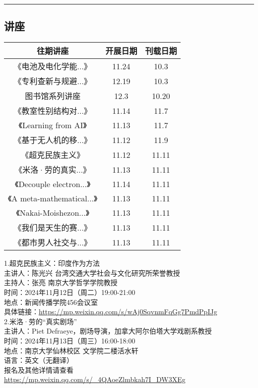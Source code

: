 \documentclass[letterpaper, 12pt]{article}
\begin{document}
\hrule
\pagebreak
\begin{multicols}{2}

\section{讲座}
\begin{tabular}{|c|c|c|}
    \hline
    往期讲座 & 开展日期 & 刊载日期\\
    \hline\hline
    《电池及电化学能...》 & 11.24 & 10.3\\
    《专利查新与规避...》 & 12.19 & 10.3\\
    图书馆系列讲座 & 12.3 & 10.20\\
    《教室性别结构对...》 & 11.14 & 11.7\\
    《Learning from AI》 & 11.13 & 11.7\\
    《基于无人机的移...》 & 11.12 & 11.9\\
    《超克民族主义》 & 11.12 & 11.11\\
    《米洛·劳的真实...》 & 11.13 & 11.11\\
    《Decouple electron...》 & 11.14 & 11.11\\
    《A meta-mathematical...》 & 11.13 & 11.11\\
    《Nakai-Moishezon...》 & 11.13 & 11.11\\
    《我们是天生的赛...》 & 11.13 & 11.11\\
    《都市男人社交与...》 & 11.13 & 11.11\\
    \hline
\end{tabular}

1.超克民族主义：印度作为方法\\
主讲人：陈光兴 台湾交通大学社会与文化研究所荣誉教授\\
主持人：张亮 南京大学哲学学院教授\\
时间：2024年11月12日（周二）19:00-21:00\\
地点：新闻传播学院456会议室\\
具体链接：\url{https://mp.weixin.qq.com/s/wAj0SqvnmFqGg7PmdPpIJg}\\

2.米洛·劳的“真实剧场”\\
主讲人：Piet Defraeye，剧场导演，加拿大阿尔伯塔大学戏剧系教授\\
时间：2024年11月13日（周三）16:00-18:00\\
地点：南京大学仙林校区 文学院二楼活水轩\\
语言：英文（无翻译）\\
报名及其他详情请查看\url{https://mp.weixin.qq.com/s/_4QAoeZlmbkah7I_DW3XEg}\\


\end{multicols}
\end{document}
